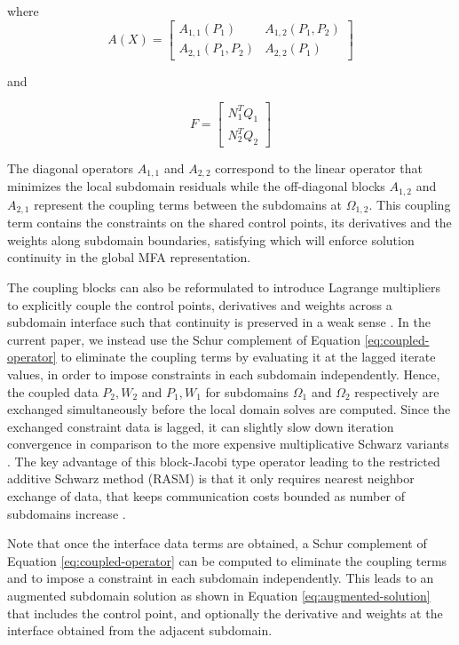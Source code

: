 \documentclass[conference]{IEEEtran}
\begin{document}
where
\begin{equation}
A(X) =
\left[
\begin{array}{c|c}
A_{1,1}(P_1) & A_{1,2}(P_1,P_2) \\
\hline
A_{2,1}(P_1,P_2) & A_{2,2}(P_1)
\end{array}
\right]
\label{eq:coupled-operator}
\end{equation}

and

\begin{equation}
F = \left[
\begin{array}{c}
N_1^T Q_{1} \\
N_2^T Q_{2}
\end{array}
\right]
\end{equation}

The diagonal operators $A_{1,1}$ and $A_{2,2}$ correspond to the linear operator that minimizes the local subdomain residuals while the off-diagonal blocks $A_{1,2}$ and $A_{2,1}$ represent the coupling terms between the subdomains at $\Omega_{1,2}$. This coupling term contains the constraints on the shared control points, its derivatives and the weights along subdomain boundaries, satisfying which will enforce solution continuity in the global MFA representation. 

The coupling blocks can also be reformulated to introduce Lagrange multipliers to explicitly couple the control points, derivatives and weights across a subdomain interface such that continuity is preserved in a weak sense \cite{nurbs-book}. In the current paper, we instead use the Schur complement of Equation \ref{eq:coupled-operator} to eliminate the coupling terms by evaluating it at the lagged iterate values, in order to impose constraints in each subdomain independently. Hence, the coupled data $P_2, W_2$ and $P_1, W_1$ for subdomains $\Omega_1$ and $\Omega_2$ respectively are exchanged simultaneously before the local domain solves are computed. Since the exchanged constraint data is lagged, it can slightly slow down iteration convergence in comparison to the more expensive multiplicative Schwarz variants \cite{smith-ddm}. The key advantage of this block-Jacobi type operator leading to the restricted additive Schwarz method (RASM) is that it only requires nearest neighbor exchange of data, that keeps communication costs bounded as number of subdomains increase \cite{gander-rasm}. 

Note that once the interface data terms are obtained, a Schur complement of Equation \ref{eq:coupled-operator} can be computed to eliminate the coupling terms and to impose a constraint in each subdomain independently. This leads to an augmented subdomain solution as shown in Equation \ref{eq:augmented-solution} that includes the control point, and optionally the derivative and weights at the interface obtained from the adjacent subdomain. 
\end{document}
